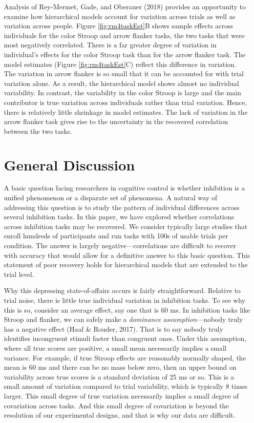 \documentclass[
  english,
  ,man]{apa6}
\begin{document}
Analysis of Rey-Mermet, Gade, and Oberauer (2018) provides an opportunity to examine how hierarchical models account for variation across trials as well as variation across people. Figure \ref{fig:rm4taskEst}B shows sample effects across individuals for the color Stroop and arrow flanker tasks, the two tasks that were most negatively correlated. There is a far greater degree of variation in individual's effects for the color Stroop task than for the arrow flanker task. The model estimates (Figure \ref{fig:rm4taskEst}C) reflect this difference in variation. The variation in arrow flanker is so small that it can be accounted for with trial variation alone. As a result, the hierarchical model shows almost no individual variability. In contrast, the variability in the color Stroop is large and the main contributor is true variation across individuals rather than trial variation. Hence, there is relatively little shrinkage in model estimates. The lack of variation in the arrow flanker task gives rise to the uncertainty in the recovered correlation between the two tasks.

\hypertarget{general-discussion}{%
\section{General Discussion}\label{general-discussion}}

A basic question facing researchers in cognitive control is whether inhibition is a unified phenomenon or a disparate set of phenomena. A natural way of addressing this question is to study the pattern of individual differences across several inhibition tasks. In this paper, we have explored whether correlations across inhibition tasks may be recovered. We consider typically large studies that enroll hundreds of participants and run tasks with 100s of usable trials per condition. The answer is largely negative---correlations are difficult to recover with accuracy that would allow for a definitive answer to this basic question. This statement of poor recovery holds for hierarchical models that are extended to the trial level.

Why this depressing state-of-affairs occurs is fairly straightforward. Relative to trial noise, there is little true individual variation in inhibition tasks. To see why this is so, consider an average effect, say one that is 60 ms. In inhibition tasks like Stroop and flanker, we can safely make a \emph{dominance assumption}---nobody truly has a negative effect (Haaf \& Rouder, 2017). That is to say nobody truly identifies incongruent stimuli faster than congruent ones. Under this assumption, where all true scores are positive, a small mean necessarily implies a small variance. For example, if true Stroop effects are reasonably normally shaped, the mean is 60 ms and there can be no mass below zero, then an upper bound on variability across true scores is a standard deviation of 25 ms or so. This is a small amount of variation compared to trial variability, which is typically 8 times larger. This small degree of true variation necessarily implies a small degree of covariation across tasks. And this small degree of covariation is beyond the resolution of our experimental designs, and that is why our data are difficult.
\end{document}
